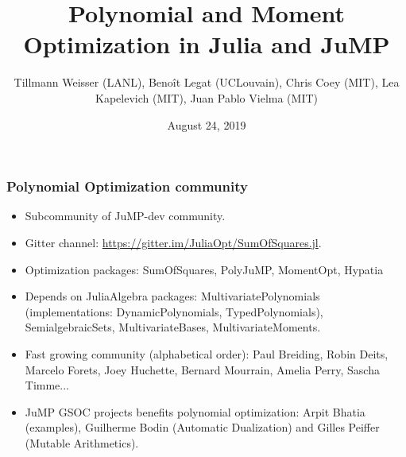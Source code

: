 \documentclass{beamer}
\title{Polynomial and Moment Optimization in Julia and JuMP}
\date{August 24, 2019}
\author{Tillmann Weisser (LANL), Beno\^it Legat (UCLouvain), Chris Coey (MIT), Lea Kapelevich (MIT), Juan Pablo Vielma (MIT)}
\begin{document}
  \maketitle

\begin{frame}
  \frametitle{Polynomial Optimization community}
  \begin{itemize}
    \item Subcommunity of JuMP-dev community.
    \item Gitter channel: \url{https://gitter.im/JuliaOpt/SumOfSquares.jl}.
    \item Optimization packages: SumOfSquares, PolyJuMP, MomentOpt, Hypatia
    \item Depends on JuliaAlgebra packages: MultivariatePolynomials (implementations: DynamicPolynomials, TypedPolynomials),
      SemialgebraicSets, MultivariateBases, MultivariateMoments.
    \item Fast growing community (alphabetical order):
      Paul Breiding,
      Robin Deits,
      Marcelo
      Forets,
      Joey Huchette,
      Bernard Mourrain,
      Amelia Perry,
      Sascha Timme...
    \item JuMP GSOC projects benefits polynomial optimization:
      Arpit Bhatia (examples),
      Guilherme Bodin (Automatic Dualization) and
      Gilles Peiffer (Mutable Arithmetics).
  \end{itemize}
\end{frame}
\end{document}
